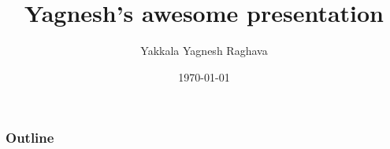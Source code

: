 \documentclass[xcolor=svgnames]{beamer}
\title{Yagnesh's awesome presentation}
\author{Yakkala Yagnesh Raghava}
\date{\today}
\institute{}
\begin{document}
\frame[plain]{\titlepage}

\begin{frame}
  \frametitle{Outline}
  \setcounter{tocdepth}{3}
  \tableofcontents
\end{frame}

\end{document}
